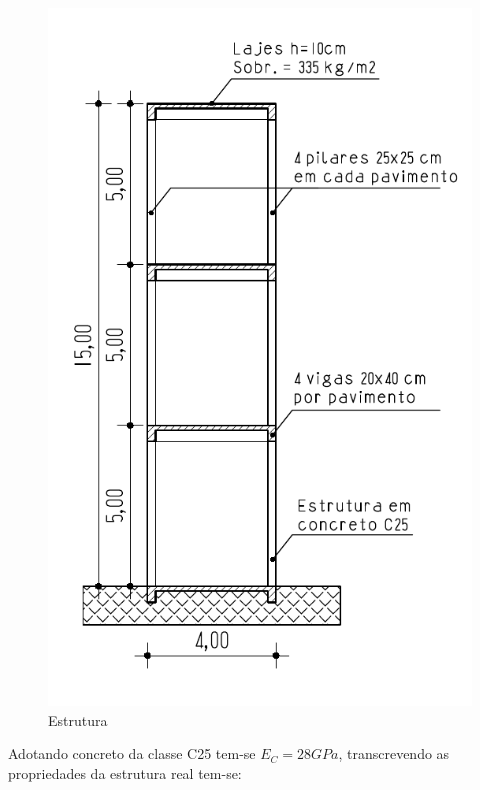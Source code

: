 \begin{figure}
\centering
\includegraphics[scale=0.7]{../images/Estrutura}
\caption{Estrutura}
\end{figure}

Adotando concreto da classe C25 tem-se \(E_C=28GPa\), transcrevendo as
propriedades da estrutura real tem-se:


